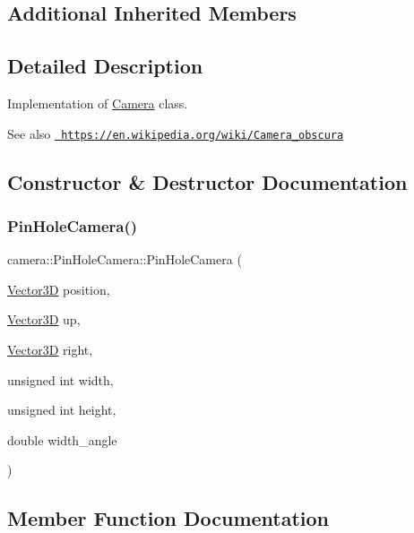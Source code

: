 \subsection*{Additional Inherited Members}


\subsection{Detailed Description}
Implementation of \mbox{\hyperlink{classcamera_1_1Camera}{Camera}} class. 

\begin{DoxySeeAlso}{See also}
\href{https://en.wikipedia.org/wiki/Camera_obscura}{\texttt{ https\+://en.\+wikipedia.\+org/wiki/\+Camera\+\_\+obscura}} 
\end{DoxySeeAlso}


\subsection{Constructor \& Destructor Documentation}
\mbox{\label{classcamera_1_1PinHoleCamera_a0d7c74abd23ababb8e244fade0443f15}} 
\subsubsection{\texorpdfstring{PinHoleCamera()}{PinHoleCamera()}}
{\footnotesize\ttfamily camera\+::\+Pin\+Hole\+Camera\+::\+Pin\+Hole\+Camera (\begin{DoxyParamCaption}\item[{\mbox{\hyperlink{classVector3D}{Vector3D}}}]{position,  }\item[{\mbox{\hyperlink{classVector3D}{Vector3D}}}]{up,  }\item[{\mbox{\hyperlink{classVector3D}{Vector3D}}}]{right,  }\item[{unsigned int}]{width,  }\item[{unsigned int}]{height,  }\item[{double}]{width\+\_\+angle }\end{DoxyParamCaption})}



\subsection{Member Function Documentation}
\mbox{\label{classcamera_1_1PinHoleCamera_a1ed550429343036f2dd14a0aacbe2c27}} 
